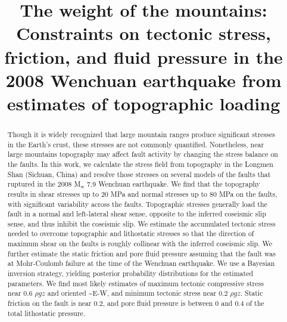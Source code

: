 \documentclass[twocolumn,jgrga]{AGUTeX}
\begin{document}
\title{The weight of the mountains: Constraints on tectonic stress, friction,
       and fluid pressure in the 2008 Wenchuan earthquake from estimates of 
       topographic loading}



\begin{abstract}
Though it is widely recognized that large mountain ranges produce significant
stresses in the Earth's crust, these stresses are not commonly quantified.
Nonetheless, near large mountains topography may affect fault activity by
changing the stress balance on the faults. In this work, we calculate the
stress field from topography in the Longmen Shan (Sichuan, China) and resolve
those stresses on several models of the faults that ruptured in the 2008
M$_\mathrm{w}$ 7.9 Wenchuan earthquake. We find that the topography results in
shear stresses up to 20 MPa and normal stresses up to 80 MPa on the faults,
with significant variability across the faults. Topographic stresses generally
load the fault in a normal and left-lateral shear sense, opposite to the
inferred coseismic slip sense, and thus inhibit the coseismic slip. We estimate
the accumulated tectonic stress needed to overcome topographic and lithostatic
stresses so that the direction of maximum shear on the faults is roughly
collinear with the inferred coseismic slip. We further estimate the static
friction and pore fluid pressure assuming that the fault was at Mohr-Coulomb
failure at the time of the Wenchuan earthquake. We use a Bayesian inversion
strategy, yielding posterior probability distributions for the estimated
parameters. We find most likely estimates of maximum tectonic compressive
stress near 0.6 $\rho g z$ and oriented \textasciitilde{}E-W, and minimum
tectonic stress near 0.2 $\rho g z$. Static friction on the fault is near 0.2,
and pore fluid pressure is between 0 and 0.4 of the total lithostatic pressure.
\end{abstract}
\end{document}
